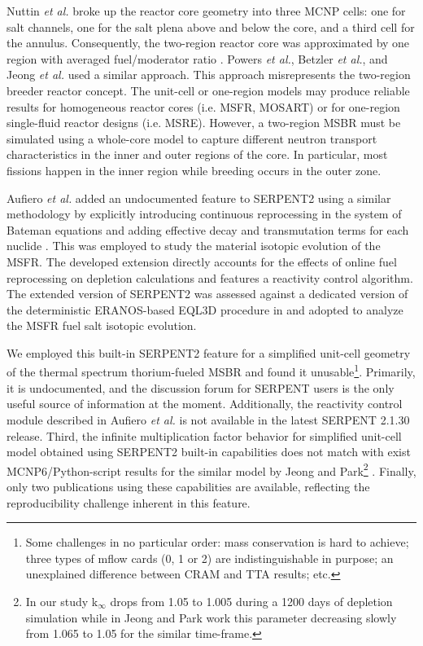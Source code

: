 Nuttin \emph{et al.} broke up the reactor core geometry into three \gls{MCNP} cells: 
one for salt channels, one for the salt plena above and below the core, and a 
third cell for the annulus. Consequently, the two-region reactor core was 
approximated by one region with averaged fuel/moderator ratio 
\cite{nuttin_potential_2005}.  Powers \emph{et 
al.}, Betzler \emph{et al.}, and Jeong \emph{et al.} 
\cite{powers_new_2013,powers_inventory_2014,betzler_modeling_2016, 
betzler_molten_2017, jeong_development_2014, jeong_equilibrium_2016} used a 
similar approach. This approach 
misrepresents the two-region breeder reactor concept. The unit-cell or one-region 
models may produce reliable results for homogeneous reactor cores (i.e. 
\gls{MSFR}, \gls{MOSART}) or for one-region single-fluid reactor designs (i.e. 
\gls{MSRE}). However, a two-region \gls{MSBR} must be simulated using a whole-core 
model to capture different neutron transport characteristics in the inner and 
outer regions of the core. In particular, most fissions happen in the inner 
region while breeding occurs in the outer zone.  

Aufiero \emph{et al.} added an undocumented 
feature to SERPENT2 
using a similar methodology by explicitly introducing 
continuous reprocessing in the system of Bateman equations and adding effective 
decay and transmutation terms for each nuclide 
\cite{aufiero_extended_2013}. This was employed to study the material isotopic evolution of the 
\gls{MSFR}\cite{aufiero_extended_2013}. The developed extension directly accounts for the effects of online fuel 
reprocessing on depletion calculations and features a reactivity control 
algorithm. The extended version of SERPENT2 was assessed against a dedicated 
version of the deterministic ERANOS-based EQL3D procedure in
\cite{ruggieri_eranos_2006, fiorina_investigation_2013} and adopted to analyze 
the \gls{MSFR} fuel salt isotopic evolution. 

We employed this built-in SERPENT2 feature for a simplified unit-cell geometry of 
the thermal spectrum thorium-fueled \gls{MSBR} and found it unusable\footnote{ 
Some challenges in no particular order: mass conservation is hard to achieve; 
three types of mflow cards (0, 1 or 2) are indistinguishable in purpose; an 
unexplained difference between CRAM and TTA results; etc.}. Primarily,
it is undocumented, and the discussion forum for SERPENT users is the only useful 
source of information at the moment. Additionally, the reactivity control module described in Aufiero \emph{et al.} is 
not available in the latest SERPENT 2.1.30 release. Third, the infinite multiplication 
factor behavior for simplified unit-cell model obtained using SERPENT2 built-in 
capabilities \cite{rykhlevskii_online_2017} does not match with exist MCNP6/Python-script
 results for the similar model by Jeong and Park\footnote{ In our 
study k$_{\infty}$ drops from 1.05 to 1.005 during a 1200 days of depletion simulation 
while in Jeong and Park work this parameter decreasing slowly from 1.065 to 1.05 for the 
similar time-frame.} \cite{jeong_equilibrium_2016}. Finally, only two publications \cite{aufiero_extended_2013, 
ashraf_nuclear_2018} using these capabilities are available, reflecting the 
reproducibility challenge inherent in this feature. 

